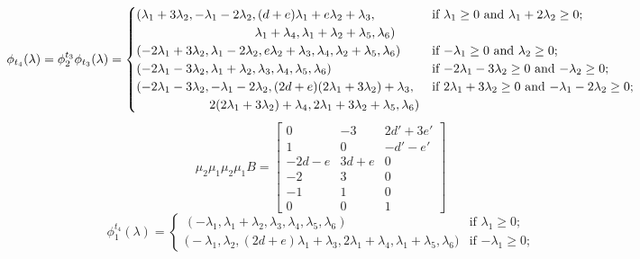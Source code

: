 \documentclass{amsart}
\numberwithin{theorem}{section}
\begin{document}
  \[
    \phi_{t_4}(\lambda)=\phi^{t_3}_2\phi_{t_3}(\lambda)
    =
    \begin{cases}
      (\lambda_1+3\lambda_2,-\lambda_1-2\lambda_2,(d+e)\lambda_1+e\lambda_2+\lambda_3, & \text{if $\lambda_1 \ge 0$ and $\lambda_1+2\lambda_2 \ge 0$;}\\
      \hspace{1.3in} \lambda_1+\lambda_4,\lambda_1+\lambda_2+\lambda_5,\lambda_6) & \\
      (-2\lambda_1+3\lambda_2,\lambda_1-2\lambda_2,e\lambda_2+\lambda_3,\lambda_4,\lambda_2+\lambda_5,\lambda_6) & \text{if $-\lambda_1 \ge 0$ and $\lambda_2 \ge 0$;}\\
      (-2\lambda_1-3\lambda_2,\lambda_1+\lambda_2,\lambda_3,\lambda_4,\lambda_5,\lambda_6) & \text{if $-2\lambda_1-3\lambda_2 \ge 0$ and $-\lambda_2 \ge 0$;}\\
      (-2\lambda_1-3\lambda_2,-\lambda_1-2\lambda_2,(2d+e)(2\lambda_1+3\lambda_2)+\lambda_3, & \text{if $2\lambda_1+3\lambda_2 \ge 0$ and $-\lambda_1-2\lambda_2 \ge 0$;}\\
      \hspace{0.8in} 2(2\lambda_1+3\lambda_2)+\lambda_4,2\lambda_1+3\lambda_2+\lambda_5,\lambda_6) & \\
    \end{cases}
  \]
  \[
    \mu_2\mu_1\mu_2\mu_1 B=\left[\begin{array}{ccc} 
    0 & -3 & 2d'+3e' \\ 
    1 & 0 & -d'-e'\\ 
    -2d-e & 3d+e & 0\\ 
    -2 & 3 & 0\\ 
    -1 & 1 & 0\\ 
    0 & 0 & 1
    \end{array}\right]
  \]
  \[
    \phi^{t_4}_1(\lambda)
    =
    \begin{cases} 
      (-\lambda_1,\lambda_1+\lambda_2,\lambda_3,\lambda_4,\lambda_5,\lambda_6) & \text{if $\lambda_1 \ge 0$;}\\
      \big(-\lambda_1,\lambda_2,(2d+e)\lambda_1+\lambda_3,2\lambda_1+\lambda_4,\lambda_1+\lambda_5,\lambda_6\big) & \text{if $-\lambda_1 \ge 0$;}
    \end{cases}
  \]
\end{document}
